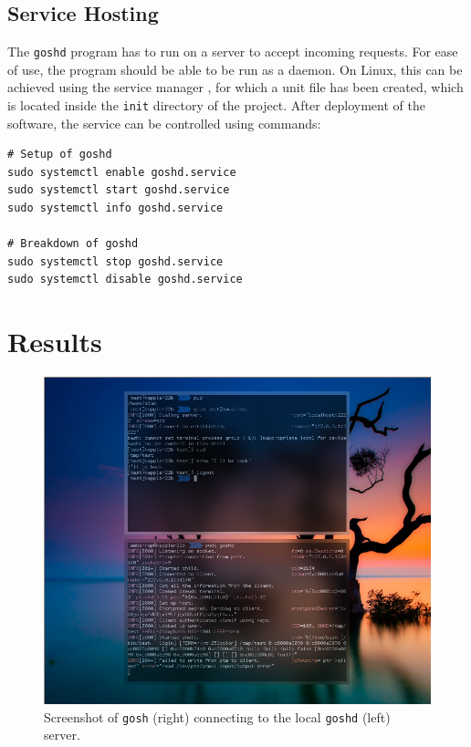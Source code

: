 \documentclass[10pt,a4paper,titlepage,twoside,english,final]{zhawreprt}
\begin{document}
\section{Service Hosting}\label{sec:ImplServiceHosting}
The \texttt{goshd} program has to run on a server to accept incoming requests.
For ease of use, the program should be able to be run as a \gls{daemon}.
On \gls{Linux}, this can be achieved using the service manager \cite{systemd}, for which a unit file has been created, which is located inside the \texttt{init} directory of the project.
After deployment of the software, the service can be controlled using \cite{systemd} commands:
\setlistingBash
\begin{lstlisting}[caption={\texttt{goshd} service control},label=lst:GoshdServiceCtl,deletekeywords={enable}]
# Setup of goshd
sudo systemctl enable goshd.service
sudo systemctl start goshd.service
sudo systemctl info goshd.service

# Breakdown of goshd
sudo systemctl stop goshd.service
sudo systemctl disable goshd.service
\end{lstlisting}


\chapter{Results}\label{chp:Results}
\begin{figure}[ht]
\includegraphics[width=\textwidth]{ohmygosh}
\caption{Screenshot of \texttt{gosh} (right) connecting to the local \texttt{goshd} (left) server.}
\label{fig:OhMyGoshScrot}
\end{figure}
\end{document}
